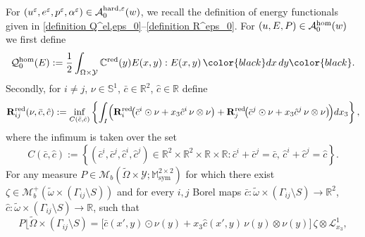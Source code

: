 \documentclass[reqno,10pt]{amsart}
\numberwithin{equation}{section}
\theoremstyle{remark}
\newcommand{\BLACK}{\color{black}}
\newcommand{\PINK}{\color{black}}
\newcommand{\calA}{\mathcal{A}}
\newcommand{\C}{\mathbb{C}}
\newcommand{\calD}{\mathcal{D}}
\newcommand{\calL}{\mathcal{L}}
\newcommand{\M}{\mathbb{M}}
\newcommand{\calQ}{\mathcal{Q}}
\newcommand{\R}{\mathbb{R}}
\newcommand{\calY}{\mathcal{Y}}
\DeclareMathOperator{\sym}{sym}
\newcommand{\eps}{\varepsilon}
\newcommand{\Mb}{\mathcal{M}_b}
\newcommand{\mres}[1]{\lfloor{#1}}
\newcommand{\ext}[1]{\widetilde{#1}}
\newcommand{\disspot}{\mathbf{R}}
\newcommand{\red}[1]{#1^{\rm red}}
\begin{document}
For $(u^\eps, e^\eps, p^\eps, \alpha^\eps) \in \calA_{0}^{\rm hard,\eps}(w)$, we recall the definition of energy functionals given in \eqref{definition Q^el,eps_0}--\eqref{definition R^eps_0}. 
For $(u,E,P) \in \calA^{\rm hom}_{0}(w)$ we first define
\begin{equation} \label{definition Q^hom_0} 
	\calQ^{\rm hom}_{0}(E) := \frac{1}{2} \int_{\Omega \times \calY} \red{\C}(y) E(x,y) : E(x,y) \,{\PINK dx\,dy\BLACK}.
\end{equation}
Secondly, for 
$i \neq j$, $\nu \in \mathbb{S}^1$, $\bar{c} \in \R^2$, $\hat{c} \in \R$ define
\begin{equation} \label{R_ij definition}
	\disspot^{\rm red}_{ij}(\nu, \bar{c}, \hat{c}) := \inf\limits_{C(\bar{c}, \hat{c})} \left\{ \int_I \!\Big( \disspot_i^{\rm red}\!\big(\bar{c}^i \odot \nu + x_3 \hat{c}^i\, \nu \otimes \nu\big) + \disspot_j^{\rm red}\!\big(\bar{c}^j \odot \nu + x_3 \hat{c}^j\, \nu \otimes \nu\big) \!\Big) dx_3 \right\},
\end{equation}
where the infimum is taken over 
the set
\[
	C(\bar{c}, \hat{c}) := \left\{ (\bar{c}^i,\bar{c}^j,\hat{c}^i,\hat{c}^j) \in \mathbb{R}^2 \times \mathbb{R}^2 \times \mathbb{R} \times \mathbb{R} : \bar{c}^i+\bar{c}^j = \bar{c},\, \hat{c}^i+\hat{c}^j = \hat{c} \right\}.
\]
For any 
measure $P \in \Mb(\ext{\Omega} \times \calY;\M^{2 \times 2}_{\sym})$ for which there exist $\zeta \in \Mb^+(\ext{\omega} \times (\Gamma_{ij} \setminus S))$ and for every $i,j$ Borel maps $\bar{c} : \ext{\omega} \times (\Gamma_{ij} \setminus S) \to \R^2$, $\hat{c} : \ext{\omega} \times (\Gamma_{ij} \setminus S) \to \R$, such that
\begin{equation} \label{P form on the interface}
	P\mres{\ext{\Omega} \times (\Gamma_{ij} \setminus S)} = \big[ \bar{c}(x',y) \odot \nu(y) + x_3 \hat{c}(x',y) \, \nu(y) \otimes \nu(y) \big]\,\zeta \otimes \calL_{x_3}^1,
\end{equation}
\end{document}
